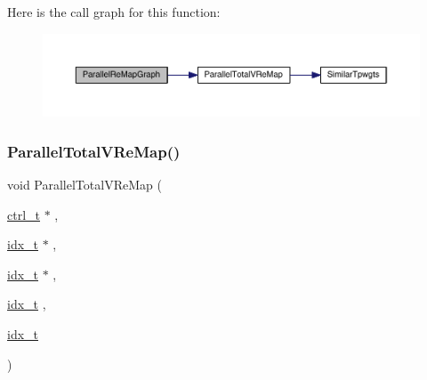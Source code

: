 Here is the call graph for this function\+:\nopagebreak
\begin{figure}[H]
\begin{center}
\leavevmode
\includegraphics[width=350pt]{a00951_a1a048af593fd6cf379b6e596ca895589_cgraph}
\end{center}
\end{figure}
\mbox{\label{a00951_acba5c2146105c8a70af8cd9c3c0cb721}} 
\subsubsection{\texorpdfstring{Parallel\+Total\+V\+Re\+Map()}{ParallelTotalVReMap()}}
{\footnotesize\ttfamily void Parallel\+Total\+V\+Re\+Map (\begin{DoxyParamCaption}\item[{\hyperlink{a00742}{ctrl\+\_\+t} $\ast$}]{,  }\item[{\hyperlink{a00876_aaa5262be3e700770163401acb0150f52}{idx\+\_\+t} $\ast$}]{,  }\item[{\hyperlink{a00876_aaa5262be3e700770163401acb0150f52}{idx\+\_\+t} $\ast$}]{,  }\item[{\hyperlink{a00876_aaa5262be3e700770163401acb0150f52}{idx\+\_\+t}}]{,  }\item[{\hyperlink{a00876_aaa5262be3e700770163401acb0150f52}{idx\+\_\+t}}]{ }\end{DoxyParamCaption})}

